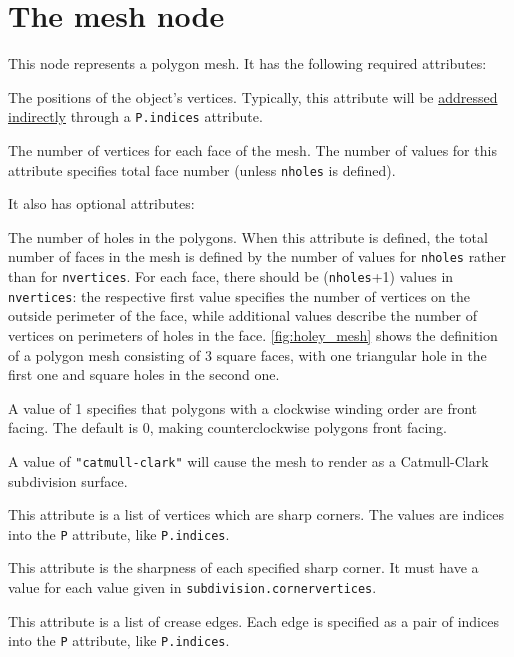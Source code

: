 \documentclass[oneside,ebook]{memoir}
\newcommand{\paramlistitemTN}[2]{\item[#2\textcolor{lightgray}{\dotfill}#1]}
\newcommand{\paramlistitemTND}[3]{\paramlistitemTN{#1 {\rmfamily({\ttfamily#3})}}{#2}}
\begin{document}
\section{The mesh node}
\label{section:meshnode}
This node represents a polygon mesh. It has the following required attributes:
\begin{paramlist}
\paramlistitemTN{point}{P}
The positions of the object's vertices.
Typically, this attribute will be \hyperref[parameter:indirect]{addressed indirectly} through a \lstinline|P.indices| attribute.
\paramlistitemTN{int}{nvertices}
The number of vertices for each face of the mesh. The number of values for this attribute specifies total face number (unless \lstinline|nholes| is defined).
\end{paramlist}
It also has optional attributes:
\begin{paramlist}
\paramlistitemTN{int}{nholes}
The number of holes in the polygons.
When this attribute is defined, the total number of faces in the mesh is defined by the number of values for \lstinline|nholes| rather than for \lstinline|nvertices|.
For each face, there should be (\lstinline|nholes|+1) values in \lstinline|nvertices|: the respective first value specifies the number of vertices on the outside perimeter of the face, while additional values describe the number of vertices on perimeters of holes in the face.
\autoref{fig:holey_mesh} shows the definition of a polygon mesh consisting of 3 square faces, with one triangular hole in the first one and square holes in the second one.
\paramlistitemTND{int}{clockwisewinding}{0}
A value of 1 specifies that polygons with a clockwise winding order are front facing. The default is 0, making counterclockwise polygons front facing.
\paramlistitemTN{string}{subdivision.scheme}
A value of \lstinline|"catmull-clark"| will cause the mesh to render as a Catmull-Clark subdivision surface.
\paramlistitemTN{int}{subdivision.cornervertices}
This attribute is a list of vertices which are sharp corners.
The values are indices into the \lstinline|P| attribute, like \lstinline|P.indices|.
\paramlistitemTN{float}{subdivision.cornersharpness}
This attribute is the sharpness of each specified sharp corner.
It must have a value for each value given in \lstinline|subdivision.cornervertices|.
\paramlistitemTN{int}{subdivision.creasevertices}
This attribute is a list of crease edges.
Each edge is specified as a pair of indices into the \lstinline|P| attribute, like \lstinline|P.indices|.
\paramlistitemTN{float}{subdivision.creasesharpness}

\end{paramlist}
\end{document}
